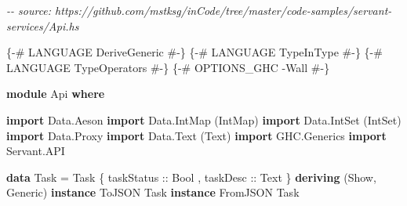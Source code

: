 \documentclass[]{article}
\newenvironment{Shaded}{}{}
\newcommand{\CommentTok}[1]{\textcolor[rgb]{0.38,0.63,0.69}{\textit{#1}}}
\newcommand{\DataTypeTok}[1]{\textcolor[rgb]{0.56,0.13,0.00}{#1}}
\newcommand{\KeywordTok}[1]{\textcolor[rgb]{0.00,0.44,0.13}{\textbf{#1}}}
\newcommand{\NormalTok}[1]{#1}
\newcommand{\OtherTok}[1]{\textcolor[rgb]{0.00,0.44,0.13}{#1}}
\begin{document}
\begin{Shaded}
\begin{Highlighting}[]
\CommentTok{{-}{-} source: https://github.com/mstksg/inCode/tree/master/code{-}samples/servant{-}services/Api.hs}

\OtherTok{\{{-}\# LANGUAGE DeriveGeneric \#{-}\}}
\OtherTok{\{{-}\# LANGUAGE TypeInType    \#{-}\}}
\OtherTok{\{{-}\# LANGUAGE TypeOperators \#{-}\}}
\OtherTok{\{{-}\# OPTIONS\_GHC {-}Wall      \#{-}\}}

\KeywordTok{module} \DataTypeTok{Api} \KeywordTok{where}

\KeywordTok{import}           \DataTypeTok{Data.Aeson}
\KeywordTok{import}           \DataTypeTok{Data.IntMap}\NormalTok{ (}\DataTypeTok{IntMap}\NormalTok{)}
\KeywordTok{import}           \DataTypeTok{Data.IntSet}\NormalTok{ (}\DataTypeTok{IntSet}\NormalTok{)}
\KeywordTok{import}           \DataTypeTok{Data.Proxy}
\KeywordTok{import}           \DataTypeTok{Data.Text}\NormalTok{ (}\DataTypeTok{Text}\NormalTok{)}
\KeywordTok{import}           \DataTypeTok{GHC.Generics}
\KeywordTok{import}           \DataTypeTok{Servant.API}

\KeywordTok{data} \DataTypeTok{Task} \OtherTok{=} \DataTypeTok{Task}
\NormalTok{    \{}\OtherTok{ taskStatus ::} \DataTypeTok{Bool}
\NormalTok{    ,}\OtherTok{ taskDesc   ::} \DataTypeTok{Text}
\NormalTok{    \}}
  \KeywordTok{deriving}\NormalTok{ (}\DataTypeTok{Show}\NormalTok{, }\DataTypeTok{Generic}\NormalTok{)}
\KeywordTok{instance} \DataTypeTok{ToJSON}   \DataTypeTok{Task}
\KeywordTok{instance} \DataTypeTok{FromJSON} \DataTypeTok{Task}


\end{Highlighting}
\end{Shaded}
\end{document}

